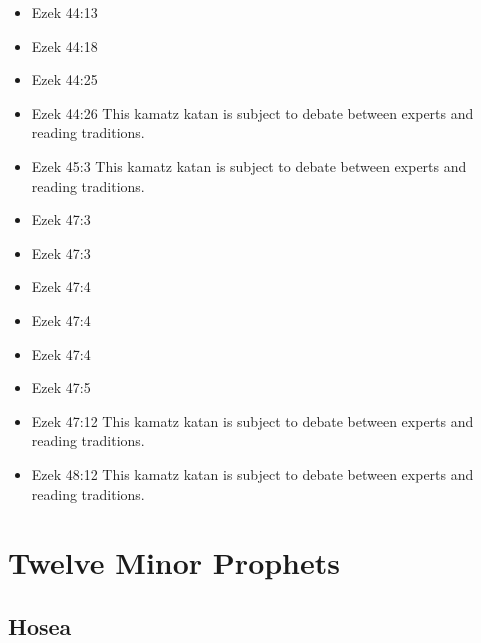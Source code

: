 \documentclass[14pt]{book}
\begin{document}
\begin{multicols}{2}
\begin{itemize}
														\item Ezek 44:13
														
														\item Ezek 44:18
														
														\item Ezek 44:25
														
														\item Ezek 44:26 This kamatz katan is subject to debate between experts and reading traditions.
														
														\item Ezek 45:3 This kamatz katan is subject to debate between experts and reading traditions.
														
														\item Ezek 47:3
														
														\item Ezek 47:3
														
														\item Ezek 47:4
														
														\item Ezek 47:4
														
														\item Ezek 47:4
														
														\item Ezek 47:5
														
														\item Ezek 47:12 This kamatz katan is subject to debate between experts and reading traditions.
														
														\item Ezek 48:12 This kamatz katan is subject to debate between experts and reading traditions.
														
													\end{itemize}\end{multicols}
												\section{Twelve Minor Prophets}
												
												\subsection{Hosea}
												
\end{document}
